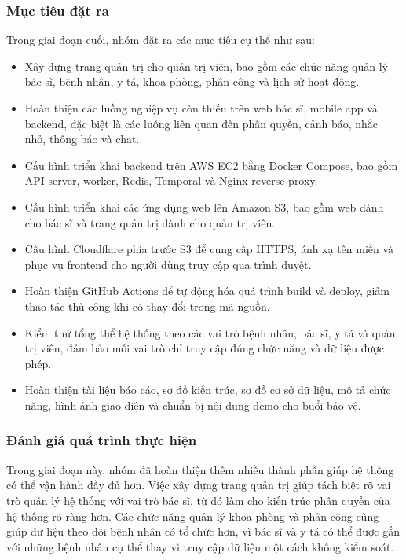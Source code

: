 \subsubsection{Mục tiêu đặt ra}
\par Trong giai đoạn cuối, nhóm đặt ra các mục tiêu cụ thể như sau:
\begin{itemize}
    \item Xây dựng trang quản trị cho quản trị viên, bao gồm các chức năng quản lý bác sĩ, bệnh nhân, y tá, khoa phòng, phân công và lịch sử hoạt động.
    \item Hoàn thiện các luồng nghiệp vụ còn thiếu trên web bác sĩ, mobile app và backend, đặc biệt là các luồng liên quan đến phân quyền, cảnh báo, nhắc nhở, thông báo và chat.
    \item Cấu hình triển khai backend trên AWS EC2 bằng Docker Compose, bao gồm API server, worker, Redis, Temporal và Nginx reverse proxy.
    \item Cấu hình triển khai các ứng dụng web lên Amazon S3, bao gồm web dành cho bác sĩ và trang quản trị dành cho quản trị viên.
    \item Cấu hình Cloudflare phía trước S3 để cung cấp HTTPS, ánh xạ tên miền và phục vụ frontend cho người dùng truy cập qua trình duyệt.
    \item Hoàn thiện GitHub Actions để tự động hóa quá trình build và deploy, giảm thao tác thủ công khi có thay đổi trong mã nguồn.
    \item Kiểm thử tổng thể hệ thống theo các vai trò bệnh nhân, bác sĩ, y tá và quản trị viên, đảm bảo mỗi vai trò chỉ truy cập đúng chức năng và dữ liệu được phép.
    \item Hoàn thiện tài liệu báo cáo, sơ đồ kiến trúc, sơ đồ cơ sở dữ liệu, mô tả chức năng, hình ảnh giao diện và chuẩn bị nội dung demo cho buổi bảo vệ.
\end{itemize}

\subsubsection{Đánh giá quá trình thực hiện}
\par Trong giai đoạn này, nhóm đã hoàn thiện thêm nhiều thành phần giúp hệ thống có thể vận hành đầy đủ hơn. Việc xây dựng trang quản trị giúp tách biệt rõ vai trò quản lý hệ thống với vai trò bác sĩ, từ đó làm cho kiến trúc phân quyền của hệ thống rõ ràng hơn. Các chức năng quản lý khoa phòng và phân công cũng giúp dữ liệu theo dõi bệnh nhân có tổ chức hơn, vì bác sĩ và y tá có thể được gắn với những bệnh nhân cụ thể thay vì truy cập dữ liệu một cách không kiểm soát.


